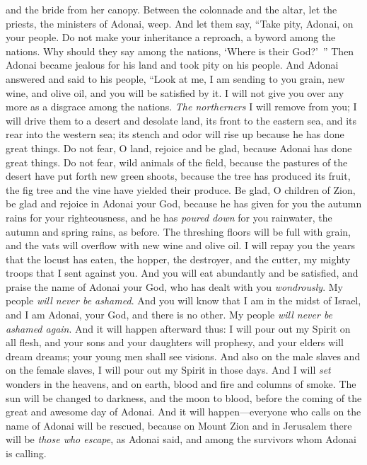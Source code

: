 \begin{biblechapter}
and the bride from her canopy.
\verse Between the colonnade and the altar, 
let the priests, the ministers of Adonai, weep. 
And let them say, “Take pity, Adonai, on your people. 
Do not make your inheritance a reproach, 
a byword among the nations. 
Why should they say among the nations, 
‘Where is their God?’ ”
 Then Adonai became jealous for his land 
and took pity on his people.
\verse And Adonai answered and said to his people, 
“Look at me, I am sending to you 
grain, new wine, and olive oil, 
and you will be satisfied by it. 
I will not give you over any more 
as a disgrace among the nations.
\verse \textit{The northerners} 
I will remove from you; 
I will drive them to a desert 
and desolate land, 
its front to the eastern sea, 
and its rear into the western sea; 
its stench and odor will rise up 
because he has done great things.
\verse Do not fear, O land, 
rejoice and be glad, 
because Adonai has done great things.
\verse Do not fear, wild animals of the field, 
because the pastures of the desert have put forth new green shoots, 
because the tree has produced its fruit, 
the fig tree and the vine 
have yielded their produce.
\verse Be glad, O children of Zion, 
be glad and rejoice in Adonai your God, 
because he has given for you 
the autumn rains for your righteousness, 
and he has \textit{poured down} for you rainwater, 
the autumn and spring rains, as before.
\verse The threshing floors will be full with grain, 
and the vats will overflow 
with new wine and olive oil.
\verse I will repay you the years 
that the locust has eaten, 
the hopper, the destroyer, and the cutter, 
my mighty troops that I sent against you.
\verse And you will eat abundantly and be satisfied, 
and praise the name of Adonai your God, 
who has dealt with you \textit{wondrously}. 
My people \textit{will never be ashamed}.
\verse And you will know that I am in the midst of Israel, 
and I am Adonai, 
your God, and there is no other. 
My people \textit{will never be ashamed again}.
  And it will happen afterward thus: 
I will pour out my Spirit on all flesh, 
and your sons and your daughters will prophesy, 
and your elders will dream dreams; 
your young men shall see visions.
\verse And also on the male slaves and on the female slaves, 
I will pour out my Spirit in those days.
\verse And I will \textit{set} wonders in the heavens, and on earth, blood and fire and columns of smoke.
\verse The sun will be changed to darkness, and the moon to blood, before the coming of the great and awesome day of Adonai.
\verse And it will happen—everyone who calls on the name of Adonai will be rescued, because on Mount Zion and in Jerusalem there will be \textit{those who escape}, as Adonai said, and among the survivors whom Adonai is calling.
\end{biblechapter}

